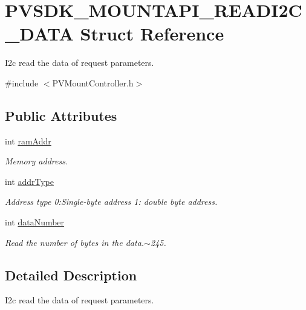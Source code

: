 \hypertarget{struct_p_v_s_d_k___m_o_u_n_t_a_p_i___r_e_a_d_i2_c___d_a_t_a}{}\section{P\+V\+S\+D\+K\+\_\+\+M\+O\+U\+N\+T\+A\+P\+I\+\_\+\+R\+E\+A\+D\+I2\+C\+\_\+\+D\+A\+TA Struct Reference}
\label{struct_p_v_s_d_k___m_o_u_n_t_a_p_i___r_e_a_d_i2_c___d_a_t_a}


I2c read the data of request parameters.  




{\ttfamily \#include $<$P\+V\+Mount\+Controller.\+h$>$}

\subsection*{Public Attributes}
\begin{DoxyCompactItemize}
\item 
int \hyperlink{struct_p_v_s_d_k___m_o_u_n_t_a_p_i___r_e_a_d_i2_c___d_a_t_a_aa8a7a6997c79ccaf11803d998bd4969b}{ram\+Addr}
\begin{DoxyCompactList}\small\item\em Memory address. \end{DoxyCompactList}\item 
int \hyperlink{struct_p_v_s_d_k___m_o_u_n_t_a_p_i___r_e_a_d_i2_c___d_a_t_a_ad3c1634013fc2e8bb0e63e3a006c0882}{addr\+Type}
\begin{DoxyCompactList}\small\item\em Address type 0\+:Single-\/byte address 1\+: double byte address. \end{DoxyCompactList}\item 
int \hyperlink{struct_p_v_s_d_k___m_o_u_n_t_a_p_i___r_e_a_d_i2_c___d_a_t_a_aab8b9d25da76eb5e3d938829eafc53e7}{data\+Number}
\begin{DoxyCompactList}\small\item\em Read the number of bytes in the data.$\sim$245. \end{DoxyCompactList}\end{DoxyCompactItemize}


\subsection{Detailed Description}
I2c read the data of request parameters. 

